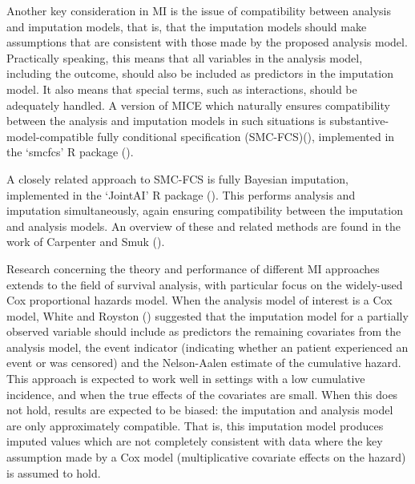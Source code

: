 \documentclass[
  letterpaper,
  paper=240mm:170mm,
  twoside=true,
  open=right,
  fontsize=10pt,
  pagesize=false,
  BCOR=15mm,
  DIV=14,
  headinclude=true,
  footinclude=false,
  headsepline=on]{scrbook}
\begin{document}
Another key consideration in MI is the issue of compatibility between
analysis and imputation models, that is, that the imputation models
should make assumptions that are consistent with those made by the
proposed analysis model. Practically speaking, this means that all
variables in the analysis model, including the outcome, should also be
included as predictors in the imputation model. It also means that
special terms, such as interactions, should be adequately handled. A
version of MICE which naturally ensures compatibility between the
analysis and imputation models in such situations is
substantive-model-compatible fully conditional specification
(SMC-FCS)(), implemented in the `smcfcs' R package
().

A closely related approach to SMC-FCS is fully Bayesian imputation,
implemented in the `JointAI' R package
(). This performs analysis and imputation simultaneously, again
ensuring compatibility between the imputation and analysis models. An
overview of these and related methods are found in the work of Carpenter
and Smuk ().

Research concerning the theory and performance of different MI
approaches extends to the field of survival analysis, with particular
focus on the widely-used Cox proportional hazards model. When the
analysis model of interest is a Cox model, White and Royston
() suggested that the imputation model for a partially observed
variable should include as predictors the remaining covariates from the
analysis model, the event indicator (indicating whether an patient
experienced an event or was censored) and the Nelson-Aalen estimate of
the cumulative hazard. This approach is expected to work well in
settings with a low cumulative incidence, and when the true effects of
the covariates are small. When this does not hold, results are expected
to be biased: the imputation and analysis model are only approximately
compatible. That is, this imputation model produces imputed values which
are not completely consistent with data where the key assumption made by
a Cox model (multiplicative covariate effects on the hazard) is assumed
to hold.
\end{document}
